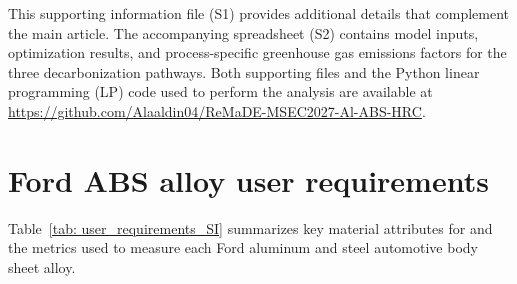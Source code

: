 This supporting information file (S1) provides additional details that complement the main article. The accompanying spreadsheet (S2) contains model inputs, optimization results, and process-specific greenhouse gas emissions factors for the three decarbonization pathways. Both supporting files and the Python linear programming (LP) code used to perform the analysis are available at \href{https://github.com/Alaaldin04/ReMaDE-MSEC2027-Al-ABS-HRC}{https://github.com/Alaaldin04/ReMaDE-MSEC2027-Al-ABS-HRC}.

\section{Ford ABS alloy user requirements} \label{SI: User Requirements}

Table~\ref{tab: user_requirements_SI} summarizes key material attributes for and the metrics used to measure each Ford aluminum and steel automotive body sheet alloy.

